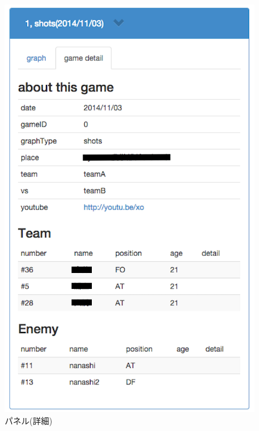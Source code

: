 \documentclass[sotsuron]{kuee}
\begin{document}
				\begin{figure}
					\begin{center}
						\includegraphics[width=\linewidth]{./png/panel2.png}
					\end{center}
					\caption{パネル(詳細)}
			  		\label{fig:panel2}
				\end{figure}
\end{document}
